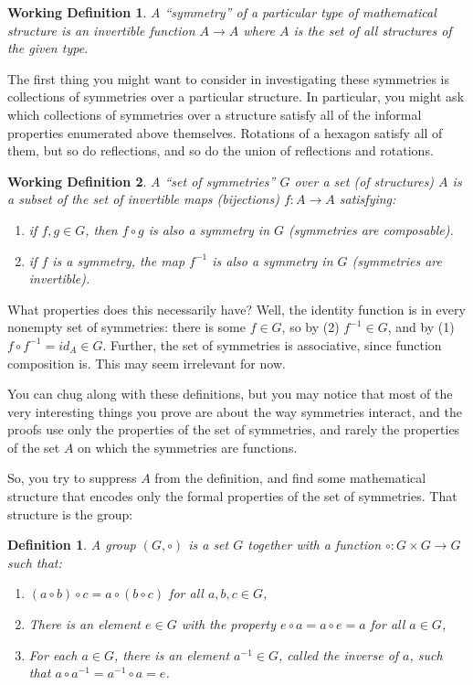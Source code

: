 \documentclass{article}
\newtheorem*{wkdf}{Working Definition}
\newtheorem*{df}{Definition}
\begin{document}
\begin{wkdf}
  A ``symmetry'' of a particular type of mathematical structure is an invertible function $A\to A$ where $A$ is the set of all structures of the given type.
\end{wkdf}

The first thing you might want to consider in investigating these symmetries is collections of symmetries over a particular structure.
In particular, you might ask which collections of symmetries over a structure satisfy all of the informal properties enumerated above themselves.
Rotations of a hexagon satisfy all of them, but so do reflections, and so do the union of reflections and rotations.

\begin{wkdf}
  A ``set of symmetries'' $G$ over a set (of structures) $A$ is a subset of the set of invertible maps (bijections) $f: A\to A$ satisfying:
  \begin{enumerate}
  \item if $f,g\in G$, then $f\circ g$ is also a symmetry in $G$ (symmetries are composable).
  \item if $f$ is a symmetry, the map $f^{-1}$ is also a symmetry in $G$ (symmetries are invertible).
  \end{enumerate}
\end{wkdf}

What properties does this necessarily have?
Well, the identity function is in every nonempty set of symmetries: there is some $f\in G$, so by (2) $f^{-1}\in G$, and by (1) $f\circ f^{-1}=id_{A}\in G$.
Further, the set of symmetries is associative, since function composition is.
This may seem irrelevant for now.

You can chug along with these definitions, but you may notice that most of the very interesting things you prove are about the way symmetries interact,
and the proofs use only the properties of the set of symmetries, and rarely the properties of the set $A$ on which the symmetries are functions.

So, you try to suppress $A$ from the definition, and find some mathematical structure that encodes only the formal properties of the set of symmetries.
That structure is the group:

\begin{df}
  A group $(G, \circ)$ is a set $G$ together with a function $\circ: G\times G \to G$ such that:
  \begin{enumerate}
  \item $(a\circ b)\circ c = a\circ (b\circ c)$ for all $a,b,c\in G$,
  \item There is an element $e\in G$ with the property $e \circ a = a\circ e = a$ for all $a\in G$,
  \item For each $a\in G$, there is an element $a^{-1}\in G$, called the inverse of $a$, such that $a\circ a^{-1} = a^{-1}\circ a = e$.
  \end{enumerate}
\end{df}
\end{document}
